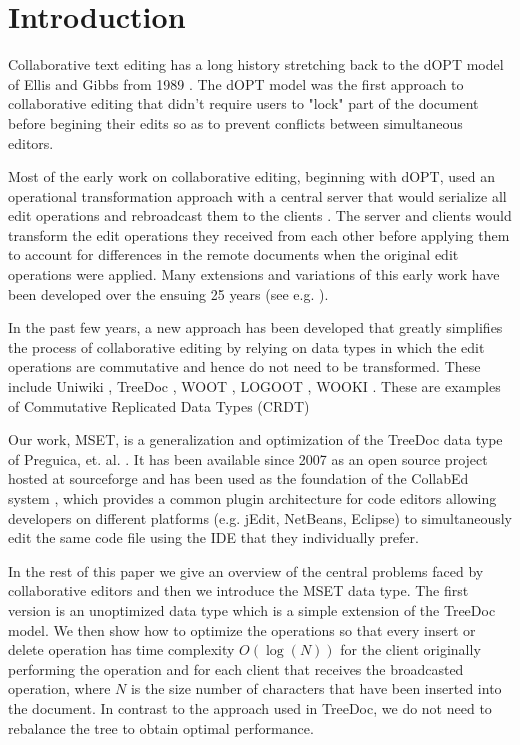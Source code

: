 \documentclass{amsart}
\begin{document}
\section{Introduction}
\label{intro}
Collaborative text editing has a long history stretching back to the dOPT model of Ellis and Gibbs from 1989 \cite{ellis_concurrency_1989}. The dOPT model was the first approach to collaborative editing that didn't require users to "lock" part of the document before begining their edits so as to prevent conflicts between simultaneous editors.

Most of the early work on collaborative editing, beginning with dOPT, used an operational transformation approach with a central server that would serialize all edit operations  and rebroadcast them to the clients \cite{nichols_high-latency_1995}. The server and clients would transform the edit operations they received from each other before applying them to account for differences in the remote documents when the original edit operations were applied. Many extensions and variations of this early work have been developed over the ensuing 25 years (see e.g. \cite{sun_operational_2004}).

In the past few years, a new approach has been developed that greatly simplifies the process of collaborative editing by relying on data types in which the edit operations are commutative and hence do not need to be transformed. These include Uniwiki \cite{oster_building_2010, oster_uniwiki:_2009},  TreeDoc \cite{ letia_consistency_2010, preguica_commutative_2009}, WOOT \cite{oster_data_2006}, LOGOOT \cite{weiss_logoot:_2008, weiss_logoot:_2009, weiss_logoot-undo:_2010}, WOOKI \cite{weiss_wooki:_2007}. These are examples of Commutative Replicated Data Types (CRDT) \cite{preguica_commutative_2009}

Our work, MSET, is a generalization and optimization of the TreeDoc data type  of Preguica, et. al.  \cite{preguica_commutative_2009}. It has been available since 2007 as an open source project hosted at sourceforge \cite{granville_collabed_2007} and has been used as the foundation of the CollabEd system  \cite{granville_collabed:_2009}, which provides a common plugin architecture for code editors allowing developers on different platforms (e.g. jEdit, NetBeans, Eclipse) to simultaneously edit the same code file using the IDE that they individually prefer.

In the rest of this paper we give an overview of the central problems faced by collaborative editors and then we introduce the MSET data type.  The first version is an unoptimized data type which is a simple extension of the TreeDoc model. We then show how to optimize the operations so that every insert or delete operation has time complexity $O(\log(N))$ for the client originally performing the operation and for each client that receives the broadcasted operation, where $N$ is the size number of characters that have been inserted into the document.  In contrast to the approach used in TreeDoc, we do not need to rebalance the tree to obtain optimal performance.
\end{document}
